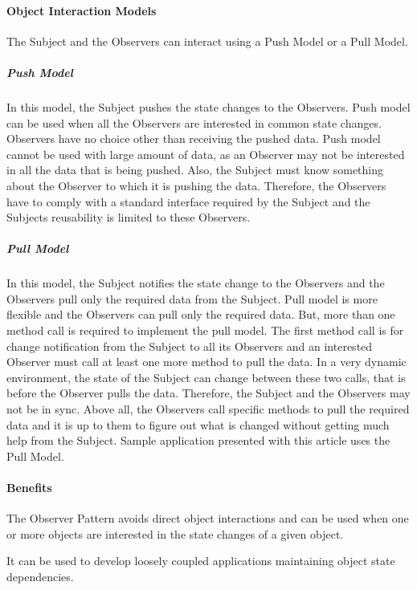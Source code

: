 \documentclass{book}
\begin{document}
\paragraph{Object Interaction Models}

The Subject and the Observers can interact using a Push Model or a Pull Model.

\subparagraph{Push Model}

In this model, the Subject pushes the state changes to the Observers. Push model can be used when all the Observers are interested in common state changes.
Observers have no choice other than receiving the pushed data. Push model cannot be used with large amount of data, as an Observer may not be interested in all the data that is being pushed.
Also, the Subject must know something about the Observer to which it is pushing the data.
Therefore, the Observers have to comply with a standard interface required by the Subject and the Subjects reusability is limited to these Observers.

\subparagraph{Pull Model}

In this model, the Subject notifies the state change to the Observers and the Observers pull only the required data from the Subject.
Pull model is more flexible and the Observers can pull only the required data. But, more than one method call is required to implement the pull model.
The first method call is for change notification from the Subject to all its Observers and an interested Observer must call at least one more method to pull the data.
In a very dynamic environment, the state of the Subject can change between these two calls, that is before the Observer pulls the data.
Therefore, the Subject and the Observers may not be in sync.
Above all, the Observers call specific methods to pull the required data and it is up to them to figure out what is changed without getting much help from the Subject.
Sample application presented with this article uses the Pull Model.

\paragraph{Benefits}

    The Observer Pattern avoids direct object interactions and can be used when one or more objects are interested in the state changes of a given object.

    It can be used to develop loosely coupled applications maintaining object state dependencies.
\end{document}
